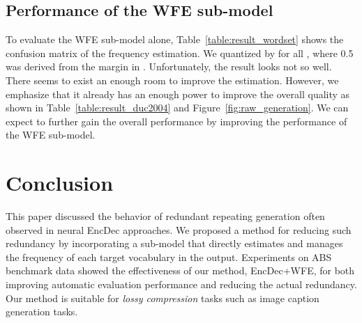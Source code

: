 \documentclass[11pt]{article}
\begin{document}
\subsection{Performance of the WFE sub-model}
To evaluate the WFE sub-model alone,
   Table~\ref{table:result_wordset} shows the confusion matrix of the frequency estimation.
We quantized  by  for all , where 0.5 was derived from the margin in .
Unfortunately, the result looks not so well.
   There seems to exist an enough room to improve the estimation.
However, we emphasize that it already has an enough power to improve the overall quality as shown in Table~\ref{table:result_duc2004} and Figure~\ref{fig:raw_generation}.
We can expect to further gain the overall performance by improving the performance of the WFE sub-model.


\section{Conclusion}
   This paper discussed the behavior of redundant repeating generation often observed in neural EncDec approaches.
We proposed a method for reducing such redundancy by incorporating a sub-model that directly estimates and manages the frequency of each target vocabulary in the output.
Experiments on ABS benchmark data showed the effectiveness of our method, EncDec+WFE, for both improving automatic evaluation performance and reducing the actual redundancy.
Our method is suitable for {\it lossy compression} tasks such as image caption generation tasks.
\end{document}
